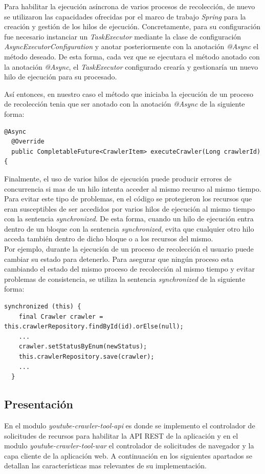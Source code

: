 \documentclass[11pt,a4paper]{article}
\begin{document}
Para habilitar la ejecución asíncrona de varios procesos de recolección, de nuevo se utilizaron las capacidades ofrecidas por el marco de trabajo \textit{Spring} para la creación y gestión de los hilos de ejecución. Concretamente, para su configuración fue necesario instanciar un \textit{TaskExecutor} mediante la clase de configuración \textit{AsyncExecutorConfiguration} y anotar posteriormente con la anotación \textit{@Async} el método deseado. De esta forma, cada vez que se ejecutara el método anotado con la anotación \textit{@Async}, el \textit{TaskExecutor} configurado crearía y gestionaría un nuevo hilo de ejecución para su procesado.
\newpage 

Así entonces, en nuestro caso el método que iniciaba la ejecución de un proceso de recolección tenia que ser anotado con la anotación \textit{@Async} de la siguiente forma:
\begin{lstlisting}[style=C]
  @Async
  @Override
  public CompletableFuture<CrawlerItem> executeCrawler(Long crawlerId) {
\end{lstlisting}	

Finalmente, el uso de varios hilos de ejecución puede producir errores de concurrencia si mas de un hilo intenta acceder al mismo recurso al mismo tiempo. Para evitar este tipo de problemas, en el código se protegieron los recursos que eran susceptibles de ser accedidos por varios hilos de ejecución al mismo tiempo con la sentencia \textit{synchronized}. De esta forma, cuando un hilo de ejecución entra dentro de un bloque con la sentencia \textit{synchronized}, evita que cualquier otro hilo acceda también dentro de dicho bloque o a los recursos del mismo.
\\

Por ejemplo, durante la ejecución de un proceso de recolección el usuario puede cambiar su estado para detenerlo. Para asegurar que ningún proceso esta cambiando el estado del mismo proceso de recolección al mismo tiempo y evitar problemas de consistencia, se utiliza la sentencia \textit{synchronized} de la siguiente forma:
\begin{lstlisting}[style=C]
  synchronized (this) {
    final Crawler crawler = this.crawlerRepository.findById(id).orElse(null);
    ...
    crawler.setStatusByEnum(newStatus);
    this.crawlerRepository.save(crawler);
    ...
  }
\end{lstlisting}	

\medskip

\subsection{Presentación}
En el modulo \textit{youtube-crawler-tool-api} es donde se implemento el controlador de solicitudes de recursos para habilitar la API REST de la aplicación y en el modulo \textit{youtube-crawler-tool-war} el controlador de solicitudes de navegador y la capa cliente de la aplicación web. A continuación en los siguientes apartados se detallan las características mas relevantes de su implementación.
\medskip 
\end{document}
